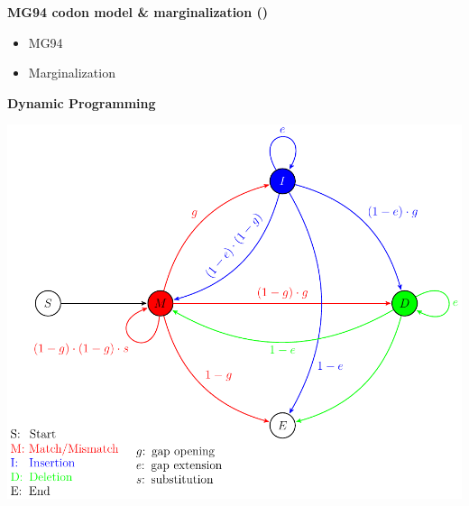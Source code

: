 
\textbf{MG94 codon model \& marginalization ()}
    \begin{itemize}
    \item MG94
    \item Marginalization
    \end{itemize}

\textbf{Dynamic Programming}
    \begin{center}
        \hspace*{-3cm}\includegraphics[scale=0.75]{figures/fig-dp-model.pdf}
    \end{center}

%

